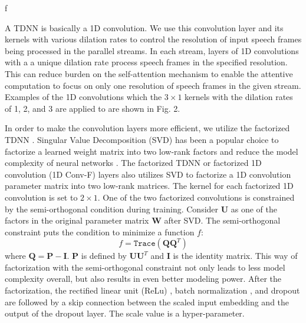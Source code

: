 f\documentclass{article}
\begin{document}
A TDNN is basically a 1D convolution. We use this convolution layer and its kernels with various dilation rates to control the resolution of input speech frames being processed in the parallel streams. In each stream, layers of 1D convolutions with a a unique dilation rate process speech frames in the specified resolution. This can reduce burden on the self-attention mechanism to enable the attentive computation to focus on only one resolution of speech frames in the given stream. Examples of the 1D convolutions which the $3 \times 1$ kernels with the dilation rates of 1, 2, and 3 are applied to are shown in Fig. 2.

In order to make the convolution layers more efficient, we utilize the factorized TDNN \cite{povey18tdnnf}. Singular Value Decomposition (SVD) has been a popular choice to factorize a learned weight matrix into two low-rank factors and reduce the model complexity of neural networks \cite{xue13,rohit16,Tucker+2016}. The factorized TDNN or factorized 1D convolution  (1D Conv-F) layers also utilizes SVD to factorize a 1D convolution parameter matrix into two low-rank matrices. The kernel for each factorized 1D convolution is set to $2 \times 1$. One of the two factorized convolutions is constrained by the semi-orthogonal condition during training. Consider $\bm{U}$ as one of the factors in the original parameter matrix $\bm{W}$ after SVD. The semi-orthogonal constraint puts the condition to minimize a function $f$:  
\begin{equation}
    f = \texttt{Trace} \left( \bm{Q} \bm{Q} ^T \right)
\end{equation}
where $\bm{Q} = \bm{P} - \bm{I}$. $\bm{P}$ is defined by $\bm{U} \bm{U}^T$ and $\bm{I}$ is the identity matrix. This way of factorization with the semi-orthogonal constraint not only leads to less model complexity overall, but also results in even better modeling power. After the factorization, the rectified linear unit (ReLu) \cite{relu}, batch normalization \cite{bn}, and dropout \cite{dropout} are followed by a skip connection \cite{He16} between the scaled input embedding and the output of the dropout layer. The scale value is a hyper-parameter.  
\end{document}
